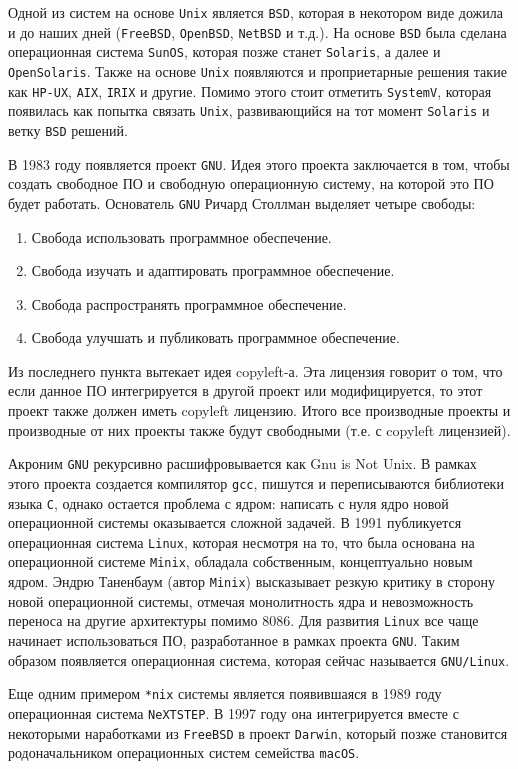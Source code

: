 Одной из систем на основе \texttt{Unix} является \texttt{BSD}, которая в
некотором виде дожила и до наших дней (\texttt{FreeBSD}, \texttt{OpenBSD},
\texttt{NetBSD} и т.д.). На основе \texttt{BSD} была сделана операционная
система \texttt{SunOS}, которая позже станет \texttt{Solaris}, а далее и
\texttt{OpenSolaris}. Также на основе \texttt{Unix} появляются и проприетарные
решения такие как \texttt{HP-UX}, \texttt{AIX}, \texttt{IRIX} и другие. Помимо
этого стоит отметить \texttt{SystemV}, которая появилась как попытка связать
\texttt{Unix}, развивающийся на тот момент \texttt{Solaris} и ветку \texttt{BSD}
решений.

В 1983 году появляется проект \texttt{GNU}. Идея этого проекта заключается в
том, чтобы создать свободное ПО и свободную операционную систему, на которой это
ПО будет работать. Основатель \texttt{GNU} Ричард Столлман выделяет четыре
свободы:

\begin{enumerate}
\item
  Свобода использовать программное обеспечение.

\item
  Свобода изучать и адаптировать программное обеспечение.

\item
  Свобода распространять программное обеспечение.

\item
  Свобода улучшать и публиковать программное обеспечение.
\end{enumerate}

Из последнего пункта вытекает идея copyleft-а. Эта лицензия говорит о том, что
если данное ПО интегрируется в другой проект или модифицируется, то этот проект
также должен иметь copyleft лицензию. Итого все производные проекты и
производные от них проекты также будут свободными (т.е. с copyleft лицензией).

Акроним \texttt{GNU} рекурсивно расшифровывается как Gnu is Not Unix. В рамках
этого проекта создается компилятор \texttt{gcc}, пишутся и переписываются
библиотеки языка \texttt{С}, однако остается проблема с ядром: написать с нуля
ядро новой операционной системы оказывается сложной задачей. В 1991 публикуется
операционная система \texttt{Linux}, которая несмотря на то, что была основана
на операционной системе \texttt{Minix}, обладала собственным, концептуально
новым ядром. Эндрю Таненбаум (автор \texttt{Minix}) высказывает резкую критику в
сторону новой операционной системы, отмечая монолитность ядра и невозможность
переноса на другие архитектуры помимо 8086. Для развития \texttt{Linux} все чаще
начинает использоваться ПО, разработанное в рамках проекта \texttt{GNU}. Таким
образом появляется операционная система, которая сейчас называется
\texttt{GNU/Linux}.

Еще одним примером \texttt{*nix} системы является появившаяся в 1989 году
операционная система \texttt{NeXTSTEP}. В 1997 году она интегрируется вместе с
некоторыми наработками из \texttt{FreeBSD} в проект \texttt{Darwin}, который
позже становится родоначальником операционных систем семейства \texttt{macOS}.
